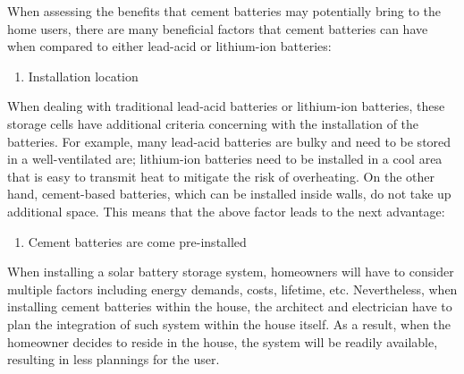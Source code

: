 When assessing the benefits that cement batteries may potentially bring to the home users, there are many beneficial factors that cement batteries can have when compared to either lead-acid or lithium-ion batteries:
\begin{enumerate}
    \item Installation location
\end{enumerate}
When dealing with traditional lead-acid batteries or lithium-ion batteries, these storage cells have additional criteria concerning with the installation of the batteries. For example, many lead-acid batteries are bulky and need to be stored in a well-ventilated are; lithium-ion batteries need to be installed in a cool area that is easy to transmit heat to mitigate the risk of overheating. On the other hand, cement-based batteries, which can be installed inside walls, do not take up additional space. This means that the above factor leads to the next advantage:
\begin{enumerate}[resume]
    \item Cement batteries are come pre-installed
\end{enumerate}
When installing a solar battery storage system, homeowners will have to consider multiple factors including energy demands, costs, lifetime, etc. Nevertheless, when installing cement batteries within the house, the architect and electrician have to plan the integration of such system within the house itself. As a result, when the homeowner decides to reside in the house, the system will be readily available, resulting in less plannings for the user.
